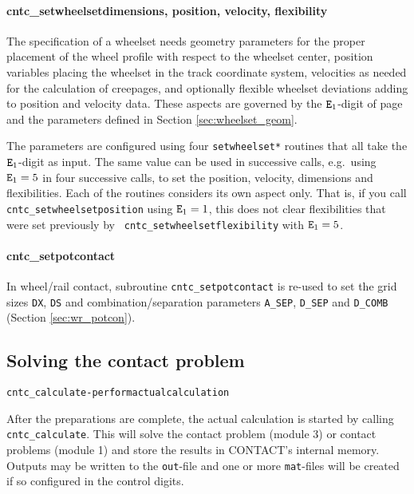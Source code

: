 \documentclass[12pt]{report}
\begin{document}
\paragraph{cntc\_setwheelsetdimensions, position, velocity, flexibility}

The specification of a wheelset needs geometry parameters for the proper
placement of the wheel profile with respect to the wheelset center,
position variables placing the wheelset in the track coordinate system,
velocities as needed for the calculation of creepages, and optionally
flexible wheelset deviations adding to position and velocity data.
These aspects are governed by the ${\tt E}_1$-digit of page
\pageref{e1-digit} and the parameters defined in Section 
\ref{sec:wheelset_geom}. 

The parameters are configured using four {\tt setwheelset*} routines that
all take the ${\tt E}_1$-digit as input. The same value can be used in
successive calls, e.g.\ using ${\tt E}_1=5$ in four successive calls, to set
the position, velocity, dimensions and flexibilities. Each of the routines
considers its own aspect only. That is, if you call {\tt 
cntc\_setwheelsetposition} using ${\tt E}_1=1$, this does not clear
flexibilities that were set previously by {\tt 
cntc\_setwheelsetflexibility} with ${\tt E}_1=5$.

\paragraph{cntc\_setpotcontact}

In wheel/rail contact, subroutine {\tt cntc\_setpotcontact} is re-used to
set the grid sizes {\tt DX}, {\tt DS} and combination/separation parameters
{\tt A\_SEP}, {\tt D\_SEP} and {\tt D\_COMB} (Section \ref{sec:wr_potcon}).

\subsection{Solving the contact problem}

\begin{alltt}\small
cntc_calculate                - perform actual calculation
\end{alltt}

After the preparations are complete, the actual calculation is started by
calling {\tt cntc\_\-cal\-cu\-late}. This will solve the contact problem
(module 3) or contact problems (module 1) and store the results in
CONTACT's internal memory. Outputs may be written to the {\tt out}-file and
one or more {\tt mat}-files will be created if so configured in the control
digits.
\end{document}
